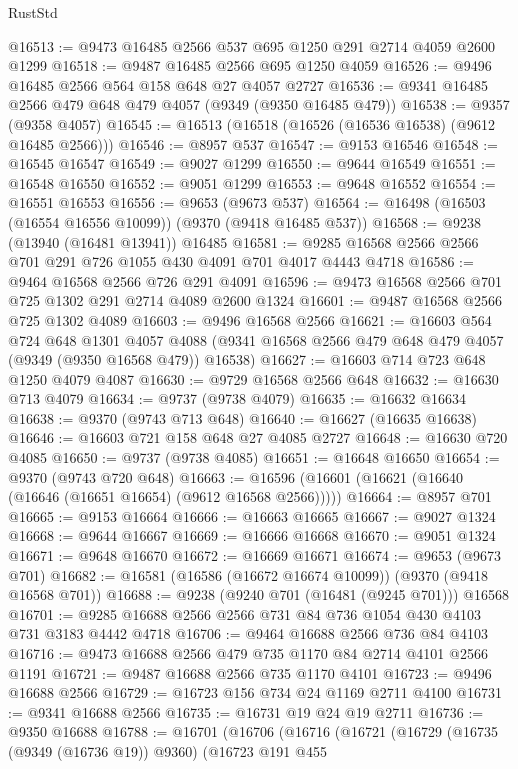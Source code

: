 \begin{lexlean}{RustStd}
\begin{coremodule}
@16513 := @9473 @16485 @2566 @537 @695 @1250 @291 @2714 @4059 @2600 @1299
@16518 := @9487 @16485 @2566 @695 @1250 @4059
@16526 := @9496 @16485 @2566 @564 @158 @648 @27 @4057 @2727
@16536 := @9341 @16485 @2566 @479 @648 @479 @4057 (@9349 (@9350 @16485 @479))
@16538 := @9357 (@9358 @4057)
@16545 := @16513 (@16518 (@16526 (@16536 @16538) (@9612 @16485 @2566)))
@16546 := @8957 @537
@16547 := @9153 @16546
@16548 := @16545 @16547
@16549 := @9027 @1299
@16550 := @9644 @16549
@16551 := @16548 @16550
@16552 := @9051 @1299
@16553 := @9648 @16552
@16554 := @16551 @16553
@16556 := @9653 (@9673 @537)
@16564 := @16498 (@16503 (@16554 @16556 @10099)) (@9370 (@9418 @16485 @537))
@16568 := @9238 (@13940 (@16481 @13941)) @16485
@16581 := @9285 @16568 @2566 @2566 @701 @291 @726 @1055 @430 @4091 @701 @4017 @4443 @4718
@16586 := @9464 @16568 @2566 @726 @291 @4091
@16596 := @9473 @16568 @2566 @701 @725 @1302 @291 @2714 @4089 @2600 @1324
@16601 := @9487 @16568 @2566 @725 @1302 @4089
@16603 := @9496 @16568 @2566
@16621 := @16603
    @564
    @724
    @648
    @1301
    @4057
    @4088
    (@9341 @16568 @2566 @479 @648 @479 @4057 (@9349 (@9350 @16568 @479)) @16538)
@16627 := @16603 @714 @723 @648 @1250 @4079 @4087
@16630 := @9729 @16568 @2566 @648
@16632 := @16630 @713 @4079
@16634 := @9737 (@9738 @4079)
@16635 := @16632 @16634
@16638 := @9370 (@9743 @713 @648)
@16640 := @16627 (@16635 @16638)
@16646 := @16603 @721 @158 @648 @27 @4085 @2727
@16648 := @16630 @720 @4085
@16650 := @9737 (@9738 @4085)
@16651 := @16648 @16650
@16654 := @9370 (@9743 @720 @648)
@16663 := @16596 (@16601 (@16621 (@16640 (@16646 (@16651 @16654) (@9612 @16568 @2566)))))
@16664 := @8957 @701
@16665 := @9153 @16664
@16666 := @16663 @16665
@16667 := @9027 @1324
@16668 := @9644 @16667
@16669 := @16666 @16668
@16670 := @9051 @1324
@16671 := @9648 @16670
@16672 := @16669 @16671
@16674 := @9653 (@9673 @701)
@16682 := @16581 (@16586 (@16672 @16674 @10099)) (@9370 (@9418 @16568 @701))
@16688 := @9238 (@9240 @701 (@16481 (@9245 @701))) @16568
@16701 := @9285 @16688 @2566 @2566 @731 @84 @736 @1054 @430 @4103 @731 @3183 @4442 @4718
@16706 := @9464 @16688 @2566 @736 @84 @4103
@16716 := @9473 @16688 @2566 @479 @735 @1170 @84 @2714 @4101 @2566 @1191
@16721 := @9487 @16688 @2566 @735 @1170 @4101
@16723 := @9496 @16688 @2566
@16729 := @16723 @156 @734 @24 @1169 @2711 @4100
@16731 := @9341 @16688 @2566
@16735 := @16731 @19 @24 @19 @2711
@16736 := @9350 @16688
@16788 := @16701
    (@16706
      (@16716
        (@16721
          (@16729
            (@16735 (@9349 (@16736 @19)) @9360)
            (@16723
              @191
              @455

\end{coremodule}
\end{lexlean}
